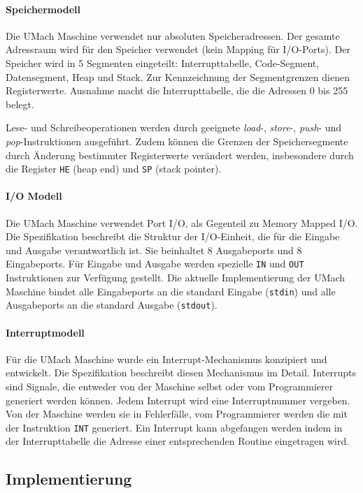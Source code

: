 \paragraph{Speichermodell}
Die UMach Maschine verwendet nur absoluten Speicheradressen. Der gesamte
Adressraum wird für den Speicher verwendet (kein Mapping für I/O-Ports). Der
Speicher wird in 5 Segmenten eingeteilt: Interrupttabelle, Code-Segment,
Datensegment, Heap und Stack. Zur Kennzeichnung der Segmentgrenzen dienen
Registerwerte. Ausnahme macht die Interrupttabelle, die die Adressen 0 bis 255
belegt.

Lese- und Schreibeoperationen werden durch geeignete \emph{load}-, 
\emph{store}-, \emph{push}- und \emph{pop}-Instruktionen ausgeführt. Zudem
können die Grenzen der Speichersegmente durch Änderung bestimmter Registerwerte
verändert werden, insbesondere durch die Register \texttt{HE} (heap end) und
\texttt{SP} (stack pointer).


\paragraph{I/O Modell}
Die UMach Maschine verwendet Port I/O, als Gegenteil zu Memory Mapped I/O. Die
Spezifikation beschreibt die Struktur der I/O-Einheit, die für die Eingabe und
Ausgabe verantwortlich ist. Sie beinhaltet 8 Ausgabeports und 8 Eingabeports.
Für Eingabe und Ausgabe werden spezielle \texttt{IN} und \texttt{OUT}
Instruktionen zur Verfügung gestellt. Die aktuelle Implementierung der UMach
Maschine bindet alle Eingabeports an die standard Eingabe (\texttt{stdin}) und
alle Ausgabeports an die standard Ausgabe (\texttt{stdout}).


\paragraph{Interruptmodell}

Für die UMach Maschine wurde ein Interrupt-Mechanismus konzipiert und
entwickelt. Die Spezifikation beschreibt diesen Mechanismus im Detail.
Interrupts sind Signale, die entweder von der Maschine selbst oder vom
Programmierer generiert werden können. Jedem Interrupt wird eine Interruptnummer
vergeben. Von der Maschine werden sie in Fehlerfälle, vom Programmierer werden
die mit der Instruktion \texttt{INT} generiert. Ein Interrupt kann abgefangen
werden indem in der Interrupttabelle die Adresse einer entsprechenden Routine
eingetragen wird.


\subsection{Implementierung}

